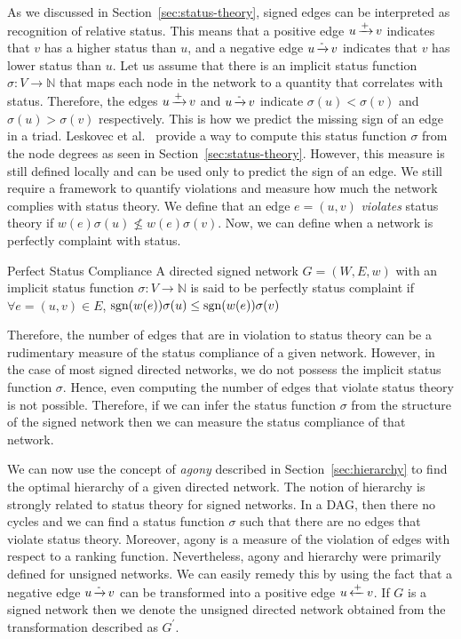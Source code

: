 As we discussed in Section~\ref{sec:status-theory}, signed edges can be interpreted as recognition of relative status. This means that a positive edge $u \operatorname*{\xrightarrow{+}} v$ indicates that $v$ has a higher status than $u$, and a negative edge $u \operatorname*{\xrightarrow{-}} v$ indicates that $v$ has lower status than $u$. Let us assume that there is an implicit status function $\sigma: V \rightarrow \mathbb{N}$ that maps each node in the network to a quantity that correlates with status. Therefore, the edges $u\operatorname*{\xrightarrow{+}}
 v$ and $u \operatorname*{\xrightarrow{-}} v$ indicate $\sigma(u)<\sigma(v)$ and $\sigma(u)>\sigma(v)$ respectively. This is how we predict the missing sign of an edge in a triad. Leskovec et al.\ \cite{leskovec2010signed} provide a way to compute this status function $\sigma$ from the node degrees as seen in Section~\ref{sec:status-theory}. However, this measure is still defined locally and can be used only to predict the sign of an edge. We still require a framework to quantify violations and measure how much the network complies with status theory. We define that an edge $e=(u,v)$ \textit{violates} status theory if $w(e)\sigma(u)\not\leq w(e)\sigma(v)$. Now, we can define when a network is perfectly complaint with status.

 \theoremstyle{definition}
 \begin{definition}{Perfect Status Compliance}
     A directed signed network $G=(W,E,w)$ with an implicit status function $\sigma: V \rightarrow \mathbb{N}$ is said to be perfectly status complaint if $\forall e=(u,v) \in E$, $\operatorname*{sgn}(w(e))\sigma(u) \leq \operatorname*{sgn}(w(e))\sigma(v)$ 
 \end{definition}

Therefore, the number of edges that are in violation to status theory can be a rudimentary measure of the status compliance of a given network. However, in the case of most signed directed networks, we do not possess the implicit status function $\sigma$. Hence, even computing the number of edges that violate status theory is not possible. Therefore, if we can infer the status function $\sigma$ from the structure of the signed network then we can measure the status compliance of that network. 

We can now use the concept of \textit{agony} described in Section~\ref{sec:hierarchy} to find the optimal hierarchy of a given directed network. The notion of hierarchy is strongly related to status theory for signed networks. In a DAG, then there no cycles and we can find a status function $\sigma$ such that there are no edges that violate status theory. Moreover, agony is a measure of the violation of edges with respect to a ranking function. Nevertheless, agony and hierarchy were primarily defined for unsigned networks. We can easily remedy this by using the fact that a negative edge $u \operatorname*{\xrightarrow{-}} v$ can be transformed into a positive edge $u \operatorname*{\xleftarrow{+}} v$. If $G$ is a signed network then we denote the unsigned directed network obtained from the transformation described as $G^\prime$.

